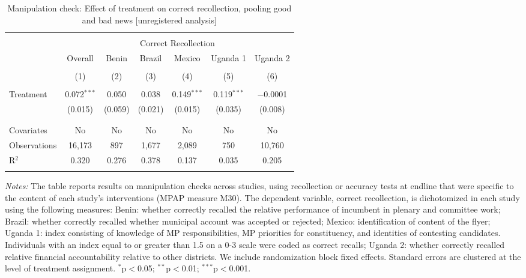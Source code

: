 \documentclass[]{article}
\begin{document}
\begin{table}[!htbp] \centering 
  \caption{Manipulation check: Effect of treatment on correct recollection, pooling good and bad news [unregistered analysis]} 
  \label{mcheck} 
\begin{tabular}{@{\extracolsep{1pt}}lcccccc} 
\\[-1.8ex]\hline 
\hline \\[-1.8ex] 
 & \multicolumn{6}{c}{Correct Recollection} \\ 
\cline{2-7} 
 & Overall & Benin & Brazil & Mexico & Uganda 1 & Uganda 2 \\ 
\\[-1.8ex] & (1) & (2) & (3) & (4) & (5) & (6)\\ 
\hline \\[-1.8ex] 
 Treatment & 0.072$^{***}$ & 0.050 & 0.038 & 0.149$^{***}$ & 0.119$^{***}$ & $-$0.0001 \\ 
  & (0.015) & (0.059) & (0.021) & (0.015) & (0.035) & (0.008) \\ 
  & & & & & & \\ 
\hline \\[-1.8ex] 
Covariates & No & No & No & No & No & No \\ 
Observations & 16,173 & 897 & 1,677 & 2,089 & 750 & 10,760 \\ 
R$^{2}$ & 0.320 & 0.276 & 0.378 & 0.137 & 0.035 & 0.205 \\ 
\hline 
\hline \\[-1.8ex] 
\end{tabular} 
\begin{flushleft}\textit{Notes:} The table reports results on manipulation checks across studies, using recollection or accuracy tests at endline that were specific to the content of each study's interventions (MPAP measure M30). The dependent variable, correct recollection, is dichotomized in each study using the following measures: Benin: whether correctly recalled the relative performance of incumbent in plenary and committee work; Brazil: whether correctly recalled whether municipal account was accepted or rejected; Mexico: identification of content of the flyer; Uganda 1: index consisting of knowledge of MP responsibilities, MP priorities for constituency, and identities of contesting candidates. Individuals with an index equal to or greater than 1.5 on a 0-3 scale were coded as correct recalls; Uganda 2: whether correctly recalled relative financial accountability relative to other districts. We include randomization block fixed effects. Standard errors are clustered at the level of treatment assignment. $^{*}$p$<$0.05; $^{**}$p$<$0.01; $^{***}$p$<$0.001.\end{flushleft}
\end{table}
\end{document}
